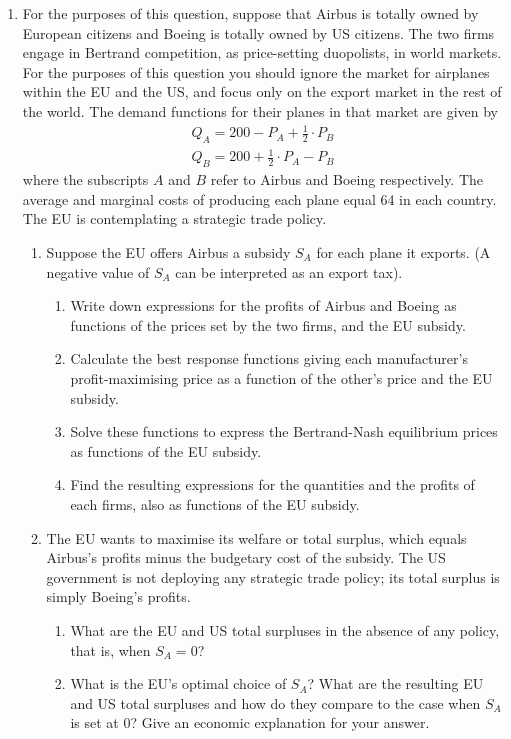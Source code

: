 \documentclass[11pt,onesided]{article}
\begin{document}
\begin{enumerate}
	\item For the purposes of this question, suppose that Airbus is totally owned by European citizens and Boeing is totally owned by US citizens. The two firms engage in Bertrand competition, as price-setting duopolists, in world markets. For the purposes of this question you should ignore the market for airplanes within the EU and the US, and focus only on the export market in the rest of the world. The demand functions for their planes in that market are given by 
	\begin{align*}
		Q_A = 200 - P_A +\frac{1}{2}\cdot P_B\\
		Q_B = 200 + \frac{1}{2} \cdot P_A- P_B 
	\end{align*}
	where the subscripts $A$ and $B$ refer to Airbus and Boeing respectively. The average and marginal costs of producing each plane equal 64 in each country. The EU is contemplating a strategic trade policy. 
	\begin{enumerate}
		\item Suppose the EU offers Airbus a subsidy $S_A$ for each plane it exports. (A negative value of $S_A$ can be interpreted as an export tax). 
		\begin{enumerate}
			\item Write down expressions for the profits of Airbus and Boeing as functions of the prices set by the two firms, and the EU subsidy. 
			\item Calculate the best response functions giving each manufacturer's profit-maximising price as a function of the other's price and the EU subsidy. 
			\item Solve these functions to express the Bertrand-Nash equilibrium prices as functions of the EU subsidy. 
			\item Find the resulting expressions for the quantities and the profits of each firms, also as functions of the EU subsidy. 
		\end{enumerate}
		\item The EU wants to maximise its welfare or total surplus, which equals Airbus's profits minus the budgetary cost of the subsidy. The US government is not deploying any strategic trade policy; its total surplus is simply Boeing's profits.
		\begin{enumerate}
			\item What are the EU and US total surpluses in the absence of any policy, that is, when $S_A = 0$?
			\item What is the EU's optimal choice of $S_A$? What are the resulting EU and US total surpluses and how do they compare to the case when $S_A$ is set at 0? Give an economic explanation for your answer.
		\end{enumerate}
	\end{enumerate}
\end{enumerate}
\end{document}

